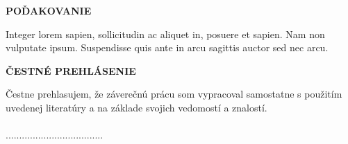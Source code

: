 \newpage
\thispagestyle{plain}
\vspace*{15cm}
\begin{large}
\noindent
\textbf{POĎAKOVANIE} \\
\end{large}
\noindent
Integer lorem sapien, sollicitudin ac aliquet in, posuere et sapien. Nam non vulputate ipsum. Suspendisse quis ante in arcu sagittis auctor sed nec arcu.

\newpage
\thispagestyle{plain}
\vspace*{15cm}
\begin{large}
\noindent
\textbf{ČESTNÉ PREHLÁSENIE} \\
\end{large}
\noindent
Čestne prehlasujem, že záverečnú prácu som vypracoval samostatne s použitím uvedenej literatúry a na základe svojich vedomostí a znalostí.
\\
\vspace*{0.5cm}\\
\hspace*{10cm}....................................\\
\hspace*{10.7cm} \Author
